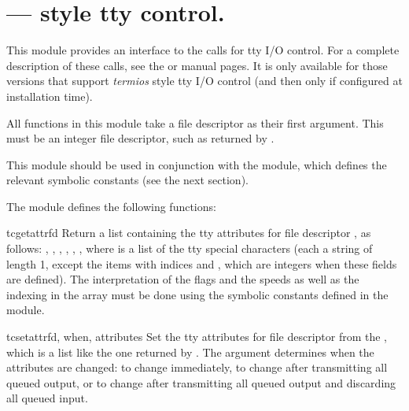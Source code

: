 \section{ ---
         \POSIX{} style tty control.}




This module provides an interface to the \POSIX{} calls for tty I/O
control.  For a complete description of these calls, see the \POSIX{} or
\UNIX{} manual pages.  It is only available for those \UNIX{} versions
that support \POSIX{} \emph{termios} style tty I/O control (and then
only if configured at installation time).

All functions in this module take a file descriptor  as their
first argument.  This must be an integer file descriptor, such as
returned by .

This module should be used in conjunction with the
 module, which defines the
relevant symbolic constants (see the next section).

The module defines the following functions:

\begin{funcdesc}{tcgetattr}{fd}
Return a list containing the tty attributes for file descriptor
, as follows: \code{[}, , ,
, , , \code{]} where
 is a list of the tty special characters (each a string of
length 1, except the items with indices  and
, which are integers when these fields are
defined).  The interpretation of the flags and the speeds as well as
the indexing in the  array must be done using the symbolic
constants defined in the  module.
\end{funcdesc}

\begin{funcdesc}{tcsetattr}{fd, when, attributes}
Set the tty attributes for file descriptor  from the
, which is a list like the one returned by
.  The  argument determines when the
attributes are changed:  to change
immediately,  to change after transmitting
all queued output, or  to change after
transmitting all queued output and discarding all queued input.
\end{funcdesc}

